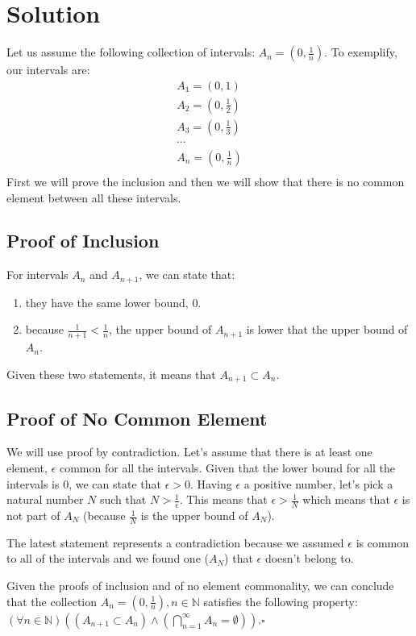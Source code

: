 \documentclass[12pt,letter]{memoir}
\begin{document}
\section*{Solution}
Let us assume the following collection of intervals: $A_n=(0, \frac{1}{n})$. To exemplify, our intervals are:
\begin{equation}\label{anseq}
\begin{split}
A_1 = (0, 1) \\
A_2 = (0, \frac{1}{2}) \\
A_3 = (0, \frac{1}{3})\\
\cdots \\
A_n = (0, \frac{1}{n})\\
\end{split}
\end{equation}
First we will prove the inclusion and then we will show that there is no common element between all these intervals.
\subsection*{Proof of Inclusion}
For intervals $A_n$ and $A_{n+1}$, we can state that:\noprelistbreak
\begin{enumerate}
\item they have the same lower bound, $0$.
\item because $\frac{1}{n+1}<\frac{1}{n}$, the upper bound of $A_{n+1}$ is lower that the upper bound of $A_n$.
\end{enumerate}
Given these two statements, it means that $A_{n+1} \subset A_n$.
\subsection*{Proof of No Common Element}
We will use proof by contradiction. Let's assume that there is at least one element, $\epsilon$ common for all the intervals.
Given that the lower bound for all the intervals is $0$, we can state that $\epsilon > 0$. Having $\epsilon$ a positive number, let's pick a natural number $N$ such that $N>\frac{1}{\epsilon}$. This means that $\epsilon>\frac{1}{N}$ which means that $\epsilon$ is not part of $A_N$ (because $\frac{1}{N}$ is the upper bound of $A_N$).\

The latest statement represents a contradiction because we assumed $\epsilon$ is common to all of the intervals and we found one ($A_N$) that $\epsilon$ doesn't belong to.

Given the proofs of inclusion and of no element commonality, we can conclude that the collection $A_n=(0, \frac{1}{n}), n \in \mathbb{N}$ satisfies the following property: $(\forall n \in \mathbb{N})((A_{n+1} \subset A_n) \land (\bigcap\limits_{n=1}^{\infty}A_n=\emptyset))$.$\square$ 
\end{document}
